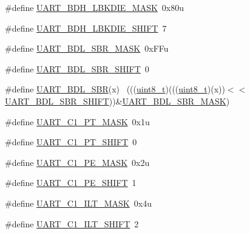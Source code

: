 \begin{DoxyCompactItemize}
\item 
\#define \hyperlink{group___u_a_r_t___register___masks_ga88fb29d1cb045a09e851a31c689ef60e}{U\+A\+R\+T\+\_\+\+B\+D\+H\+\_\+\+L\+B\+K\+D\+I\+E\+\_\+\+M\+A\+SK}~0x80u
\item 
\#define \hyperlink{group___u_a_r_t___register___masks_gace1227bd2507a7c5df95398e097cb7af}{U\+A\+R\+T\+\_\+\+B\+D\+H\+\_\+\+L\+B\+K\+D\+I\+E\+\_\+\+S\+H\+I\+FT}~7
\item 
\#define \hyperlink{group___u_a_r_t___register___masks_ga4471e77a5cfda8db1950aac0b204d964}{U\+A\+R\+T\+\_\+\+B\+D\+L\+\_\+\+S\+B\+R\+\_\+\+M\+A\+SK}~0x\+F\+Fu
\item 
\#define \hyperlink{group___u_a_r_t___register___masks_gad59af590652e14fd8d4a0d46ce48205a}{U\+A\+R\+T\+\_\+\+B\+D\+L\+\_\+\+S\+B\+R\+\_\+\+S\+H\+I\+FT}~0
\item 
\#define \hyperlink{group___u_a_r_t___register___masks_ga9a4c1b71fc2de587237f1381f0f69d75}{U\+A\+R\+T\+\_\+\+B\+D\+L\+\_\+\+S\+BR}(x)                                                ~(((\hyperlink{_p_e___types_8h_aba7bc1797add20fe3efdf37ced1182c5}{uint8\+\_\+t})(((\hyperlink{_p_e___types_8h_aba7bc1797add20fe3efdf37ced1182c5}{uint8\+\_\+t})(x))$<$$<$\hyperlink{group___u_a_r_t___register___masks_gad59af590652e14fd8d4a0d46ce48205a}{U\+A\+R\+T\+\_\+\+B\+D\+L\+\_\+\+S\+B\+R\+\_\+\+S\+H\+I\+FT}))\&\hyperlink{group___u_a_r_t___register___masks_ga4471e77a5cfda8db1950aac0b204d964}{U\+A\+R\+T\+\_\+\+B\+D\+L\+\_\+\+S\+B\+R\+\_\+\+M\+A\+SK})
\item 
\#define \hyperlink{group___u_a_r_t___register___masks_ga5a1c05b549b94de9232fbac665b3f584}{U\+A\+R\+T\+\_\+\+C1\+\_\+\+P\+T\+\_\+\+M\+A\+SK}~0x1u
\item 
\#define \hyperlink{group___u_a_r_t___register___masks_ga1638e7faa5063dab6afd34353fde4c89}{U\+A\+R\+T\+\_\+\+C1\+\_\+\+P\+T\+\_\+\+S\+H\+I\+FT}~0
\item 
\#define \hyperlink{group___u_a_r_t___register___masks_ga0204f696872c2e5f92413bb11d0170d1}{U\+A\+R\+T\+\_\+\+C1\+\_\+\+P\+E\+\_\+\+M\+A\+SK}~0x2u
\item 
\#define \hyperlink{group___u_a_r_t___register___masks_ga1113f7bea6e6612fcc04db049d41cd1e}{U\+A\+R\+T\+\_\+\+C1\+\_\+\+P\+E\+\_\+\+S\+H\+I\+FT}~1
\item 
\#define \hyperlink{group___u_a_r_t___register___masks_ga52e0789bf5650788a4ecbed75cd2b3d3}{U\+A\+R\+T\+\_\+\+C1\+\_\+\+I\+L\+T\+\_\+\+M\+A\+SK}~0x4u
\item 
\#define \hyperlink{group___u_a_r_t___register___masks_ga6066d98a54cf4ba19f40a196a0bd3ee0}{U\+A\+R\+T\+\_\+\+C1\+\_\+\+I\+L\+T\+\_\+\+S\+H\+I\+FT}~2
$$
\end{DoxyCompactItemize}
